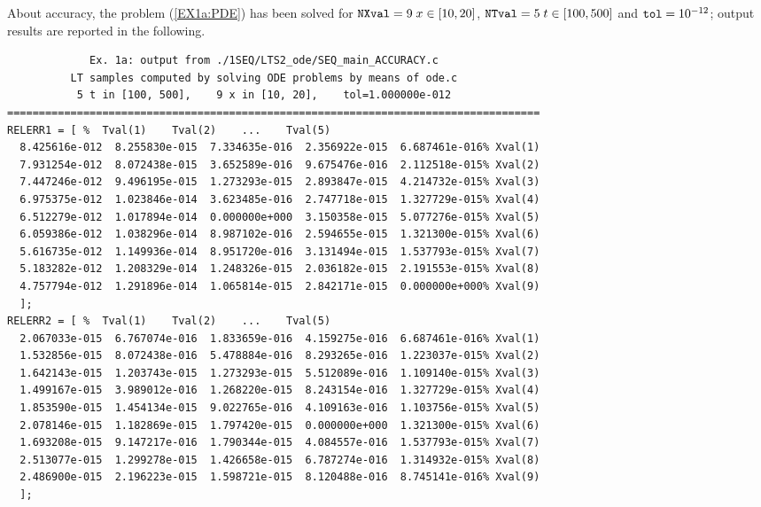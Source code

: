 \documentclass[a4paper,10pt]{report}%
\begin{document}
About accuracy, the problem (\ref{EX1a:PDE}) has been solved for ${\tt NXval}=9\; x\in[10,20]$,
${\tt NTval}=5\; t\in[100,500]$ and ${\tt tol}=10^{-12}$; output results are reported in the following.
\begin{lstlisting}
             Ex. 1a: output from ./1SEQ/LTS2_ode/SEQ_main_ACCURACY.c
          LT samples computed by solving ODE problems by means of ode.c
           5 t in [100, 500],    9 x in [10, 20],    tol=1.000000e-012
====================================================================================
RELERR1 = [ %  Tval(1)    Tval(2)    ...    Tval(5)
  8.425616e-012  8.255830e-015  7.334635e-016  2.356922e-015  6.687461e-016% Xval(1)
  7.931254e-012  8.072438e-015  3.652589e-016  9.675476e-016  2.112518e-015% Xval(2)
  7.447246e-012  9.496195e-015  1.273293e-015  2.893847e-015  4.214732e-015% Xval(3)
  6.975375e-012  1.023846e-014  3.623485e-016  2.747718e-015  1.327729e-015% Xval(4)
  6.512279e-012  1.017894e-014  0.000000e+000  3.150358e-015  5.077276e-015% Xval(5)
  6.059386e-012  1.038296e-014  8.987102e-016  2.594655e-015  1.321300e-015% Xval(6)
  5.616735e-012  1.149936e-014  8.951720e-016  3.131494e-015  1.537793e-015% Xval(7)
  5.183282e-012  1.208329e-014  1.248326e-015  2.036182e-015  2.191553e-015% Xval(8)
  4.757794e-012  1.291896e-014  1.065814e-015  2.842171e-015  0.000000e+000% Xval(9)
  ];
RELERR2 = [ %  Tval(1)    Tval(2)    ...    Tval(5)
  2.067033e-015  6.767074e-016  1.833659e-016  4.159275e-016  6.687461e-016% Xval(1)
  1.532856e-015  8.072438e-016  5.478884e-016  8.293265e-016  1.223037e-015% Xval(2)
  1.642143e-015  1.203743e-015  1.273293e-015  5.512089e-016  1.109140e-015% Xval(3)
  1.499167e-015  3.989012e-016  1.268220e-015  8.243154e-016  1.327729e-015% Xval(4)
  1.853590e-015  1.454134e-015  9.022765e-016  4.109163e-016  1.103756e-015% Xval(5)
  2.078146e-015  1.182869e-015  1.797420e-015  0.000000e+000  1.321300e-015% Xval(6)
  1.693208e-015  9.147217e-016  1.790344e-015  4.084557e-016  1.537793e-015% Xval(7)
  2.513077e-015  1.299278e-015  1.426658e-015  6.787274e-016  1.314932e-015% Xval(8)
  2.486900e-015  2.196223e-015  1.598721e-015  8.120488e-016  8.745141e-016% Xval(9)
  ];
\end{lstlisting}
\end{document}
